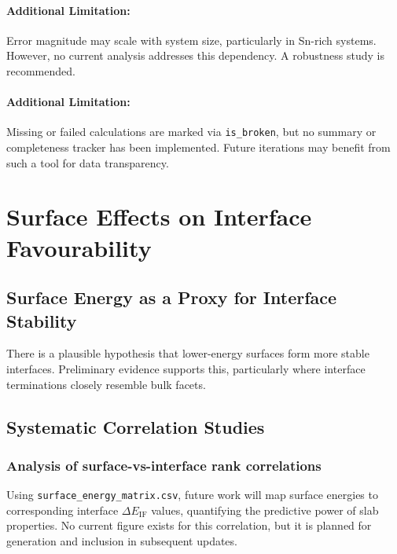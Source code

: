
\paragraph{Additional Limitation:}

Error magnitude may scale with system size, particularly in Sn-rich systems. However, no current analysis addresses this dependency. A robustness study is recommended.


\paragraph{Additional Limitation:}

Missing or failed calculations are marked via \texttt{is\_broken}, but no summary or completeness tracker has been implemented. Future iterations may benefit from such a tool for data transparency.

\section{Surface Effects on Interface Favourability}

\label{section:surface_effects}

\subsection{Surface Energy as a Proxy for Interface Stability}

There is a plausible hypothesis that lower-energy surfaces form more stable interfaces. Preliminary evidence supports this, particularly where interface terminations closely resemble bulk facets.

\subsection{Systematic Correlation Studies}

\subsubsection{Analysis of surface-vs-interface rank correlations}

Using \texttt{surface\_energy\_matrix.csv}, future work will map surface energies to corresponding interface $\Delta E_\mathrm{IF}$ values, quantifying the predictive power of slab properties. No current figure exists for this correlation, but it is planned for generation and inclusion in subsequent updates.

